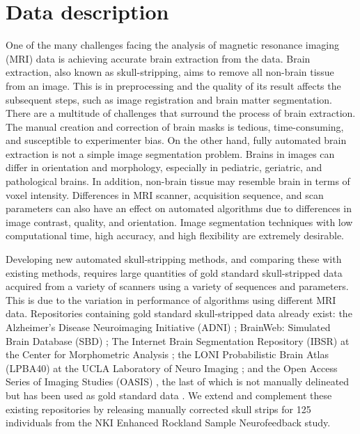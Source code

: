 \section*{Data description}

\par One of the many challenges facing the analysis of magnetic resonance imaging (MRI) data is achieving accurate brain extraction from the data. Brain extraction, also known as skull-stripping, aims to remove all non-brain tissue from an image. This is \DIFdelbegin {}\DIFdelend \DIFaddbegin {}\DIFaddend in preprocessing and the quality of its result affects the subsequent steps, such as image registration and brain matter segmentation. There are a multitude of challenges that surround the process of brain extraction. The manual creation and correction of brain masks is tedious, time-consuming, and susceptible to experimenter bias. On the other hand, fully automated brain extraction is not a simple image segmentation problem. Brains in images can differ in orientation and morphology, especially in pediatric, geriatric, and pathological brains. In addition, non-brain tissue may resemble brain in terms of voxel intensity. Differences in MRI scanner, acquisition sequence, and scan parameters can also have an effect on automated algorithms due to differences in image contrast, quality, and orientation. Image segmentation techniques with low computational time, high accuracy, and high flexibility are extremely desirable.
\par Developing new automated skull-stripping methods, and comparing these with existing methods, requires large quantities of gold standard skull-stripped data acquired from a variety of scanners using a variety of sequences and parameters. This is due to the variation in performance of algorithms using different MRI data. Repositories containing gold standard skull-stripped data already exist: the Alzheimer's Disease Neuroimaging Initiative (ADNI) \cite{pmid17476317}; BrainWeb: Simulated Brain Database (SBD) \cite{brainweb}; The Internet Brain Segmentation Repository (IBSR) at the Center for Morphometric Analysis \cite{IBSR}; the LONI Probabilistic Brain Atlas (LPBA40) at the UCLA Laboratory of Neuro Imaging \cite{lpba40}; and the Open Access Series of Imaging Studies (OASIS) \cite{oasis}, the last of which is not manually delineated but has been used as gold standard data \cite{Iglesias2011, MASS}. We extend and complement these existing repositories by releasing manually corrected skull strips for 125 individuals from the NKI Enhanced Rockland Sample Neurofeedback study. \DIFaddbegin {}\DIFaddend 

